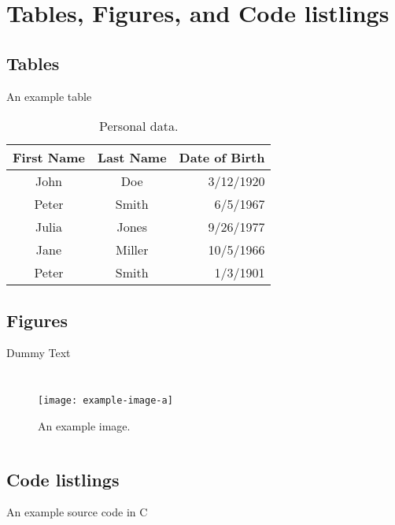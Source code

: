 \documentclass{ELSAbeamer}
\begin{document}
\section{Tables, Figures, and Code listlings}

\subsection{Tables}

\begin{frame}{An example table}
\begin{table}[t]
    \begin{tabular}{ccr}
        \toprule
        First Name & Last Name & Date of Birth \\
        \midrule
        John    & Doe       & 3/12/1920 \\
        Peter   & Smith     & 6/5/1967 \\
        Julia   & Jones     & 9/26/1977 \\
        Jane    & Miller    & 10/5/1966 \\
        Peter   & Smith     & 1/3/1901 \\
        \bottomrule
    \end{tabular}
    \caption{Personal data.}
\end{table}
\end{frame}

\subsection{Figures}

\begin{frame}{Dummy Text}
\begin{columns}
 \justifying
\scriptsize \lipsum[1]

\begin{figure}
    \centering
     \texttt{[image: example-image-a]}
     \caption{An example image.}
\end{figure}
\end{columns}
\end{frame}

\subsection{Code listlings}

\begin{frame}{An example source code in C}
\sleepSort
\end{frame}
\end{document}
